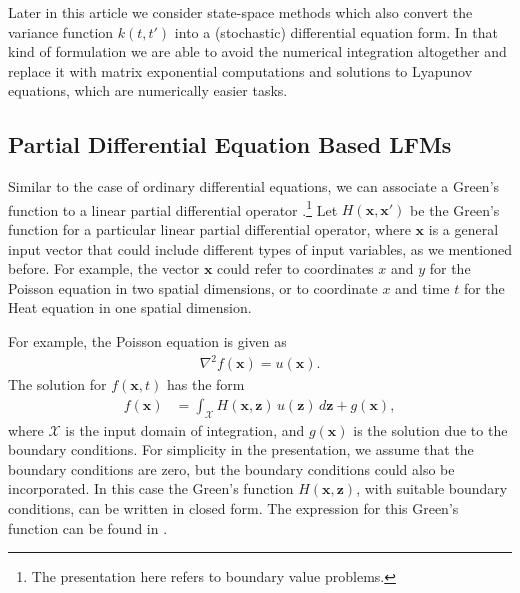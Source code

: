 \documentclass[journal]{IEEEtran}
\newcommand{\simo}[1]{{\color{red}#1}}
\begin{document}
Later in this article we consider state-space methods which also convert the variance function $k(t,t')$ into a (stochastic) differential equation form. In that kind of formulation we are able to avoid the numerical integration altogether and replace it with matrix exponential computations and solutions to Lyapunov equations, which are numerically easier tasks.



\subsection{Partial Differential Equation Based LFMs}
%
Similar to the case of ordinary differential equations, we can associate a Green's function to a linear partial differential operator \cite{Myintu:LPDEBook:2006, Polyanin:Handbook02}.\footnote{The presentation here refers to boundary value problems.} Let $H(\mathbf{x}, \mathbf{x}')$ be the Green's function for a particular linear partial differential operator, where $\mathbf{x}$ is a general input vector that could include different types of input variables, as we mentioned before. For example, the vector $\mathbf{x}$ could refer to coordinates $x$ and $y$ for the Poisson equation in two spatial dimensions, or to coordinate $x$ and time $t$ for the Heat equation in one spatial dimension.

For example, the Poisson equation is given as
\begin{align*}
  \nabla^2 f(\mathbf{x}) = u(\mathbf{x}).
\end{align*}
%
The solution for $f(\mathbf{x},t)$ has the form
\begin{align*}
f(\mathbf{x}) & = \int_{\mathcal{X}} H(\mathbf{x}, \mathbf{z})\,
                u(\mathbf{z})\,d\mathbf{z} + g(\mathbf{x}),
\end{align*}
%
where $\mathcal{X}$ is the input domain of integration, and $g(\mathbf{x})$ is the solution due to the boundary conditions. For simplicity in the presentation, we assume that the boundary conditions are zero, but the boundary conditions could also be incorporated. In this case the Green's function $H(\mathbf{x}, \mathbf{z})$, with suitable boundary conditions, can be written in closed form. The expression for this Green's function can be found in \cite{Polyanin:Handbook02}. 
\end{document}
